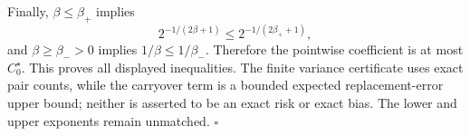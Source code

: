 Finally, \(\beta\le\beta_+\) implies
\[
2^{-1/(2\beta+1)}\le2^{-1/(2\beta_++1)},
\]
and \(\beta\ge\beta_->0\) implies \(1/\beta\le1/\beta_-\). Therefore the pointwise coefficient is at most \(C_0^\star\). This proves all displayed inequalities. The finite variance certificate uses exact pair counts, while the carryover term is a bounded expected replacement-error upper bound; neither is asserted to be an exact risk or exact bias. The lower and upper exponents remain unmatched. \(\square\)